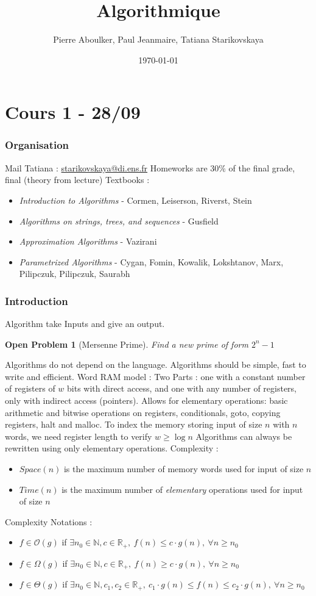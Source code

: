\documentclass{cours}
\title{Algorithmique}
\author{Pierre Aboulker, Paul Jeanmaire, Tatiana Starikovskaya}
\date{\today}
\newtheorem{openpb}{Open Problem}
\begin{document}
\part{Cours 1 - 28/09}
\section{Organisation}
Mail Tatiana : \url{starikovskaya@di.ens.fr}
Homeworks are 30\% of the final grade, final (theory from lecture)
Textbooks : 
\begin{itemize}
    \item \textsl{Introduction to Algorithms} - Cormen, Leiserson, Riverst, Stein
    \item \textsl{Algorithms on strings, trees, and sequences} - Gusfield
    \item \textsl{Approximation Algorithms} - Vazirani
    \item \textsl{Parametrized Algorithms} - Cygan, Fomin, Kowalik, Lokshtanov, Marx, Pilipczuk, Pilipczuk, Saurabh
\end{itemize}

\section{Introduction}
Algorithm take Inputs and give an output.
\begin{openpb}[Mersenne Prime]
    Find a new prime of form $2^{n} - 1$
\end{openpb}
Algorithms do not depend on the language. Algorithms should be simple, fast to write and efficient.
Word RAM model : Two Parts : one with a constant number of registers of $w$ bits with direct access, and one with any number of registers, only with indirect access (pointers). 
Allows for elementary operations: basic arithmetic and bitwise operations on registers, conditionals, goto, copying registers, halt and malloc. 
To index the memory storing input of size $n$ with $n$ words, we need register length to verify $w \geq \log n$
Algorithms can always be rewritten using only elementary operations. 
Complexity : 
\begin{itemize}
    \item $Space(n)$ is the maximum number of memory words used for input of size $n$
    \item $Time(n)$ is the maximum number of \textsl{elementary} operations used for input of size $n$
\end{itemize}
Complexity Notations : 
\begin{itemize}
    \item $f \in \mathcal{O}(g)$ if $\exists n_0 \in \mathbb{N}, c \in \mathbb{R}_{+},\ f(n) \leq c \cdot g(n), \ \forall n \geq n_0$
    \item $f \in \Omega(g)$ if $\exists n_0 \in \mathbb{N}, c \in \mathbb{R}_{+},\ f(n) \geq c \cdot g(n), \ \forall n \geq n_0$
    \item $f \in \Theta(g)$ if $\exists n_0 \in \mathbb{N}, c_{1}, c_{2} \in \mathbb{R}_{+},\ c_{1} \cdot g(n) \leq f(n) \leq c_{2} \cdot g(n), \ \forall n \geq n_0$
\end{itemize}
\end{document}
